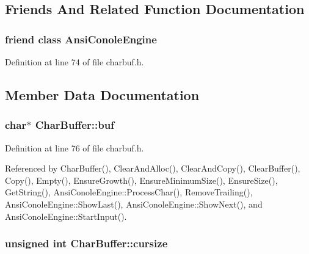 \subsection{Friends And Related Function Documentation}
\subsubsection[{\texorpdfstring{Ansi\+Conole\+Engine}{AnsiConoleEngine}}]{\setlength{\rightskip}{0pt plus 5cm}friend class {\bf Ansi\+Conole\+Engine}\hspace{0.3cm}{\ttfamily [friend]}}\hypertarget{classCharBuffer_ada87df74cf9242ca8f0efe5b88f9c212}{}\label{classCharBuffer_ada87df74cf9242ca8f0efe5b88f9c212}


Definition at line 74 of file charbuf.\+h.



\subsection{Member Data Documentation}
\subsubsection[{\texorpdfstring{buf}{buf}}]{\setlength{\rightskip}{0pt plus 5cm}char$\ast$ Char\+Buffer\+::buf\hspace{0.3cm}{\ttfamily [private]}}\hypertarget{classCharBuffer_a8bcd8491b24db4197b311eb361609674}{}\label{classCharBuffer_a8bcd8491b24db4197b311eb361609674}


Definition at line 76 of file charbuf.\+h.



Referenced by Char\+Buffer(), Clear\+And\+Alloc(), Clear\+And\+Copy(), Clear\+Buffer(), Copy(), Empty(), Ensure\+Growth(), Ensure\+Minimum\+Size(), Ensure\+Size(), Get\+String(), Ansi\+Conole\+Engine\+::\+Process\+Char(), Remove\+Trailing(), Ansi\+Conole\+Engine\+::\+Show\+Last(), Ansi\+Conole\+Engine\+::\+Show\+Next(), and Ansi\+Conole\+Engine\+::\+Start\+Input().

\subsubsection[{\texorpdfstring{cursize}{cursize}}]{\setlength{\rightskip}{0pt plus 5cm}unsigned int Char\+Buffer\+::cursize\hspace{0.3cm}{\ttfamily [private]}}\hypertarget{classCharBuffer_ac3265c68505802fbe8b590d5a423b0d0}{}\label{classCharBuffer_ac3265c68505802fbe8b590d5a423b0d0}


